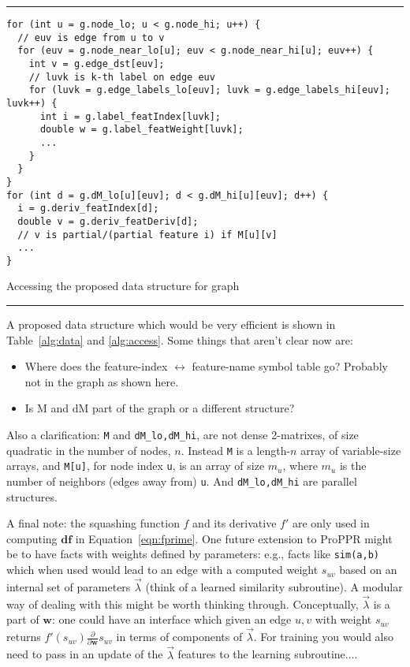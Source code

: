 \documentclass[12pt]{article}
\newcommand{\vek}[1]{\textbf{#1}}
\newcommand{\ddw}{\frac{\partial}{\partial\vek{w}}}
\newcommand{\M}{\textrm{M}}
\newcommand{\dM}{\textrm{dM}}
\newcommand{\df}{\textbf{df}}
\begin{document}
\begin{table}
\hrule
\begin{verbatim}
for (int u = g.node_lo; u < g.node_hi; u++) {
  // euv is edge from u to v
  for (euv = g.node_near_lo[u]; euv < g.node_near_hi[u]; euv++) {
    int v = g.edge_dst[euv];
    // luvk is k-th label on edge euv
    for (luvk = g.edge_labels_lo[euv]; luvk = g.edge_labels_hi[euv]; luvk++) {
      int i = g.label_featIndex[luvk];
      double w = g.label_featWeight[luvk];
      ...
    }
  }
}
for (int d = g.dM_lo[u][euv]; d < g.dM_hi[u][euv]; d++) {
  i = g.deriv_featIndex[d];
  double v = g.deriv_featDeriv[d];
  // v is partial/(partial feature i) if M[u][v]
  ...
}
\end{verbatim}
\caption{Accessing the proposed data structure for graph} \label{alg:access}
\hrule
\end{table}

A proposed data structure which would be very efficient is shown in
Table~\ref{alg:data} and \ref{alg:access}.  Some things that aren't
clear now are:
\begin{itemize}
\item Where does the feature-index $\leftrightarrow$ feature-name
  symbol table go?  Probably not in the graph as shown here.
\item Is $\M$ and $\dM$ part of the graph or a different structure?
\end{itemize}
Also a clarification: \texttt{M} and \texttt{dM\_lo,dM\_hi}, are not
dense 2-matrixes, of size quadratic in the number of nodes, $n$.
Instead \texttt{M} is a length-$n$ array of variable-size arrays, and
\texttt{M[u]}, for node index \texttt{u}, is an array of size $m_u$,
where $m_u$ is the number of neighbors (edges away from) \texttt{u}.
And \texttt{dM\_lo,dM\_hi} are parallel structures.

A final note: the squashing function $f$ and its derivative $f'$ are
only used in computing $\df$ in Equation~\ref{eqn:fprime}.  One future
extension to ProPPR might be to have facts with weights defined by
parameters: e.g., facts like \texttt{sim(a,b)} which when used would
lead to an edge with a computed weight $s_{uv}$ based on an internal
set of parameters $\vec{\lambda}$ (think of a learned similarity
subroutine).  A modular way of dealing with this might be worth
thinking through.  Conceptually, $\vec{\lambda}$ is a part of
$\vek{w}$: one could have an interface which given an edge $u,v$ with
weight $s_{uv}$ returns $f'(s_{uv})\ddw s_{uv}$ in terms of components
of $\vec{\lambda}$.  For training you would also need to pass in an
update of the $\vec{\lambda}$ features to the learning subroutine....
\end{document}
